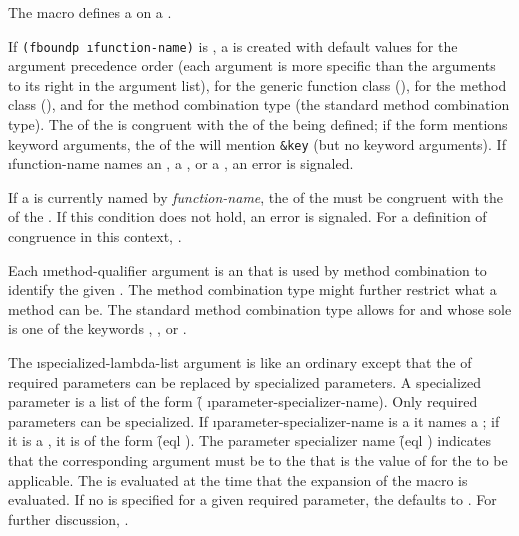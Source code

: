 The macro  defines a  on a 
.  

If {\tt (fboundp \i{function-name})} is \nil, a 
 is created with default values for 
the argument precedence order
(each argument is more specific than the arguments to its right
in the argument list),
for the generic function class (),
for the method class (),
and for the method combination type (the standard method combination type).
The  of the  is
congruent with the  of the 
 being defined; if the
 form mentions keyword arguments, the  of
the  
will mention {\tt &key} (but no keyword
arguments).  If \i{function-name} names 
an ,
a , or a , 
an error is signaled.
 
If a  is currently named by {\it function-name},
the  of the
 must be congruent with the  of the 
.
If this condition does not hold, an error is signaled.  
For a definition of congruence in this context, \seesection\GFMethodLambdaListCongruency.
 

Each \i{method-qualifier} argument is an  that is used by
method combination to identify the given .  
The method combination type might further
restrict what a method  can be.
The standard method combination type allows for  and
 whose sole
 is one of the keywords , , or .
 
The \i{specialized-lambda-list} argument is like an ordinary
 except that the  of required parameters can
be replaced by specialized parameters.  A specialized parameter is a
list of the form 
\f{( \i{parameter-specializer-name})}.
Only required parameters can be
specialized.  If \i{parameter-specializer-name} is a  it names a
; if it is a ,
it is of the form \f{(eql )}.  The parameter
specializer name \f{(eql )} indicates
that the corresponding argument must be  to the  that
is the value of  for the  to be applicable.  
The  is evaluated at the time
that the expansion of the  macro is evaluated.  
If no  is specified for a given
required parameter, the  defaults to 
.
For further discussion, \seesection\IntroToMethods.
 

